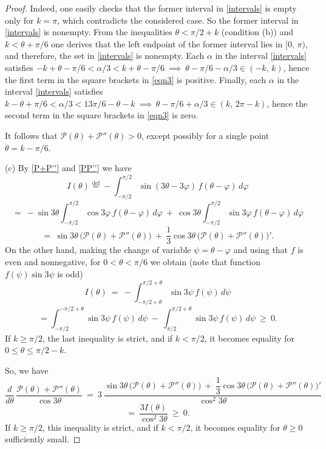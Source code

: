 \documentclass[a4paper,12pt]{article}
\newcommand{\eqdef}{\stackrel{\mathrm{def}}{=}}
\newcommand {\PPP}{\mathcal{P}}
\theoremstyle{remark}
\theoremstyle{definition}
\begin{document}
\begin{proof}
Indeed, one easily checks that the former interval in \eqref{intervals} is empty only for $k=\pi$, which contradicts the considered case. So the former interval in \eqref{intervals} is nonempty. From the inequalities $\theta < \pi/2+k$ (condition (b)) and $k< \theta+\pi/6$ one derives that the left endpoint of the former interval lies in $[0,\, \pi)$, and therefore, the set in \eqref{intervals} is nonempty. Each $\alpha$ in the interval \eqref{intervals} satisfies $-k+\theta-\pi/6<\alpha/3<k+\theta-\pi/6\ \implies\ \theta-\pi/6-\alpha/3 \in (-k,\, k)$, hence the first term in the square brackets in \eqref{eqn3} is positive. Finally, each $\alpha$ in the interval \eqref{intervals} satisfies $k-\theta+\pi/6 <\alpha/3< 13\pi/6-\theta-k\ \implies\ \theta-\pi/6+\alpha/3 \in (k,\, 2\pi-k)$, hence the second term in the square brackets in \eqref{eqn3} is zero.

It follows that $\PPP(\theta) + \PPP''(\theta) > 0$, except possibly for a single point $\theta = k - \pi/6$.
	\vspace{2mm}

(c) By \eqref{P+P''} and \eqref{PP''} we have
$$
I(\theta) \eqdef -\int_{-\pi/2}^{\pi/2} \sin(3\theta-3\varphi)\, f(\theta-\varphi)\, d\varphi
$$ $$
=\ -\sin 3\theta \int_{-\pi/2}^{\pi/2} \cos 3\varphi\, f(\theta-\varphi)\, d\varphi\
+\ \cos 3\theta \int_{-\pi/2}^{\pi/2} \sin 3\varphi\, f(\theta-\varphi)\, d\varphi
$$ $$ =\ \sin 3\theta\, \big( \PPP(\theta) + \PPP''(\theta) \big)\
+\ \dfrac{1}{3} \cos 3\theta\, \big( \PPP(\theta) + \PPP''(\theta) \big)'.
$$
On the other hand, making the change of variable $\psi = \theta-\varphi$ and using that $f$ is even and nonnegative, for $0 < \theta < \pi/6$ we obtain (note that function $f(\psi)\sin3\psi$ is odd)
$$
I(\theta)\ =\ -\int_{-\pi/2+\theta}^{\pi/2+\theta} \sin 3\psi\, f(\psi)\, d\psi $$ $$
=	 \int_{-\pi/2}^{-\pi/2+\theta} \sin 3\psi\, f(\psi)\, d\psi
\ -\ \int_{\pi/2}^{\pi/2+\theta} \sin 3\psi\, f(\psi)\, d\psi\ \ge\ 0.
$$
If $k \ge \pi/2$, the last inequality is strict, and if $k < \pi/2$, it becomes equality for $0\le \theta \le \pi/2-k$.

So, we have
$$
\dfrac{d}{d\theta}\, \dfrac{\PPP(\theta) + \PPP''(\theta)}{\cos 3\theta}\ =\ 3\ \dfrac{\sin 3\theta\, \big( \PPP(\theta) + \PPP''(\theta) \big)\
+\ \dfrac{1}{3} \cos 3\theta\, \big( \PPP(\theta) + \PPP''(\theta) \big)'}{\cos^2 3\theta}\ $$ $$ =\ \dfrac{3I(\theta)}{\cos^2 3\theta}\ \ge \ 0.
$$
If $k \ge \pi/2$, this inequality is strict, and if $k < \pi/2$, it becomes equality for $\theta\ge 0$ sufficiently small.
\vspace{2mm}


\end{proof}
\end{document}

